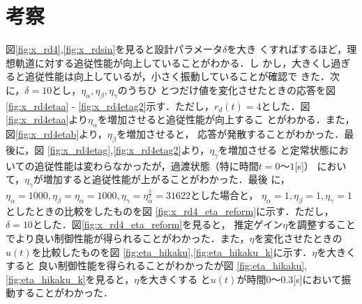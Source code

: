 \documentclass[a4paper,12pt]{jarticle}
\begin{document}
\section{考察}
図\ref{fig:x_rd4},\ref{fig:x_rdsin}を見ると設計パラメータ$\delta$を大き
くすればするほど，理想軌道に対する追従性能が向上していることがわかる．し
かし，大きくし過ぎると追従性能は向上しているが，小さく振動していることが確認で
きた．次に，$\delta=10$とし，$\eta_\alpha,\eta_\beta,\eta_\gamma$のうちひ
とつだけ値を変化させたときの応答を図\ref{fig:x_rd4etaa} -
\ref{fig:x_rd4etag2}示す．ただし，$r_d(t)=4$とした．図\ref{fig:x_rd4etaa}より$\eta_\alpha$を増加させると追従性能が向上するこ
とがわかる．また，図\ref{fig:x_rd4etab}より，$\eta_\beta$を増加させると，
応答が発散することがわかった．最後に，図
\ref{fig:x_rd4etag},\ref{fig:x_rd4etag2}より，$\eta_\gamma$を増加させる
と定常状態においての追従性能は変わらなかったが，過渡状態（特に時間$t=0〜1$[s]）
において，$\eta_\gamma$が増加すると追従性能が上がることがわかった．最後
に，$\eta_\alpha=1000,\eta_\beta=\eta_\alpha=1000,\eta_\gamma=\eta^\frac{3}{2}_\alpha=31622$とした場合と，
$\eta_\alpha=1,\eta_\beta=1,\eta_\gamma=1$としたときの比較をしたものを図
\ref{fig:x_rd4_eta_reform}に示す．ただし，$\delta=10$とした．図\ref{fig:x_rd4_eta_reform}を見ると，
推定ゲイン$\eta$を調整することでより良い制御性能が得られることがわかった．また，$\eta$を変化させたときの$u(t)$を比較したものを図
\ref{fig:eta_hikaku},\ref{fig:eta_hikaku_k}に示す．$\eta$を大きくすると
良い制御性能を得られることがわかったが図
\ref{fig:eta_hikaku},\ref{fig:eta_hikaku_k}を見ると，$\eta$を大きくする
と$u(t)$が時間$0〜0.3$[s]において振動することがわかった．
\\
\end{document}
